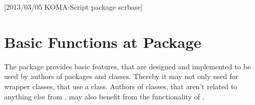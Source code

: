 %
%
%
%
%
%
%
%
% 
%
%
%
%

[2013/03/05 KOMA-Script package scrbase]


\chapter{Basic Functions at Package }

%

The package  provides basic features, that are designed and
implemented to be used by authors of packages and classes. Thereby it may not
only used for wrapper classes, that use a \KOMAScript{} class. Authors of
classes, that aren't related to anything else from \KOMAScript{}, may also
benefit from the functionality of .

